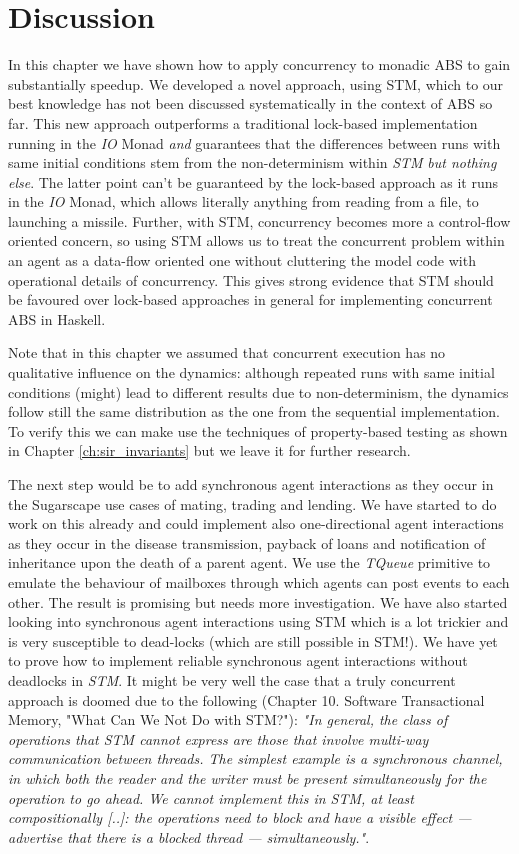 \section{Discussion}
In this chapter we have shown how to apply concurrency to monadic ABS to gain substantially speedup. We developed a novel approach, using STM, which to our best knowledge has not been discussed systematically in the context of ABS so far. This new approach outperforms a traditional lock-based implementation running in the \textit{IO} Monad \textit{and} guarantees that the differences between runs with same initial conditions stem from the non-determinism within \textit{STM} \textit{but nothing else}. The latter point can't be guaranteed by the lock-based approach as it runs in the \textit{IO} Monad, which allows literally anything from reading from a file, to launching a missile. Further, with STM, concurrency becomes more a control-flow oriented concern, so using STM allows us to treat the concurrent problem within an agent as a data-flow oriented one without cluttering the model code with operational details of concurrency. This gives strong evidence that STM should be favoured over lock-based approaches in general for implementing concurrent ABS in Haskell.

Note that in this chapter we assumed that concurrent execution has no qualitative influence on the dynamics: although repeated runs with same initial conditions (might) lead to different results due to non-determinism, the dynamics follow still the same distribution as the one from the sequential implementation. To verify this we can make use the techniques of property-based testing as shown in Chapter \ref{ch:sir_invariants} but we leave it for further research.

The next step would be to add synchronous agent interactions as they occur in the Sugarscape use cases of mating, trading and lending. We have started to do work on this already and could implement also one-directional agent interactions as they occur in the disease transmission, payback of loans and notification of inheritance upon the death of a parent agent. We use the \textit{TQueue} primitive to emulate the behaviour of mailboxes through which agents can post events to each other. The result is promising but needs more investigation. We have also started looking into synchronous agent interactions using STM which is a lot trickier and is very susceptible to dead-locks (which are still possible in STM!). We have yet to prove how to implement reliable synchronous agent interactions without deadlocks in \textit{STM}. It might be very well the case that a truly concurrent approach is doomed due to the following \cite{marlow_parallel_2013} (Chapter 10. Software Transactional Memory, "What Can We Not Do with STM?"): \textit{"In general, the class of operations that STM cannot express are those that involve multi-way communication between threads. The simplest example is a synchronous channel, in which both the reader and the writer must be present simultaneously for the operation to go ahead. We cannot implement this in STM, at least compositionally [..]: the operations need to block and have a visible effect — advertise that there is a blocked thread — simultaneously."}. 

